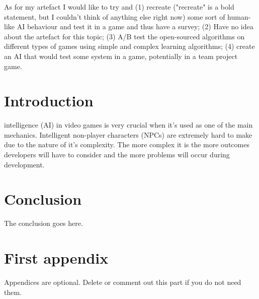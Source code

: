 \documentclass[journal]{IEEEtran}
\begin{document}
As for my artefact I would like to try and (1) recreate ("recreate" is a bold statement, but I couldn't think of anything else right now) some sort of human-like AI behaviour and test it in a game and thus have a survey; (2) Have no idea about the artefact for this topic; (3) A/B test the open-sourced algorithms on different types of games using simple and complex learning algorithms; (4) create an AI that would test some system in a game, potentially in a team project game.

\section{Introduction}
% 
% 
% 
% 
 intelligence (AI) in video games is very crucial when it's used as one of the main mechanics. Intelligent non-player characters (NPCs) are extremely hard to make due to the nature of it's complexity. The more complex it is the more outcomes developers will have to consider and the more problems will occur during development. 

\section{Conclusion}
The conclusion goes here.






\appendices
\section{First appendix}
Appendices are optional. Delete or comment out this part if you do not need them.

\end{document}
